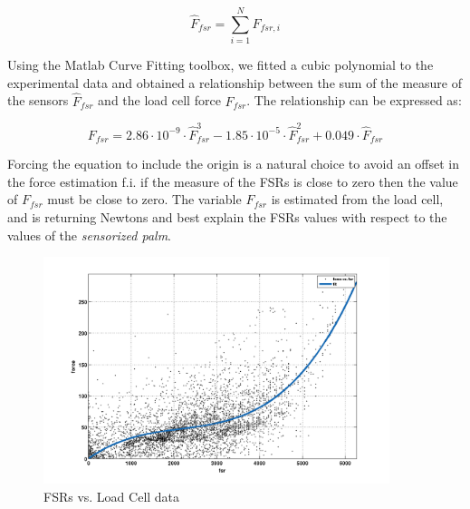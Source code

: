 \begin{equation}
\hat{F}_{fsr} = \sum_{i=1}^{N} F_{fsr,i}
\label{eq:sumofFSR}
\end{equation}

Using the Matlab Curve Fitting toolbox, we fitted a cubic polynomial to the experimental data and obtained a relationship between the sum of the measure of the sensors $\hat{F}_{fsr}$ and the load cell force $F_{fsr}$. The relationship can be expressed as:

\begin{equation}
F_{fsr} = 2.86 \cdot 10^{-9}\cdot \hat{F}_{fsr}^3 - 1.85 \cdot 10^{-5} \cdot \hat{F}_{fsr}^2 + 0.049 \cdot \hat{F}_{fsr} 
\label{eq:fsrdummyfit}
\end{equation}

Forcing the equation to include the origin is a natural choice to avoid an offset in the force estimation f.i. if the measure of the FSRs is close to zero then the value of $F_{fsr}$ must be close to zero.
The variable $F_{fsr}$ is estimated from the load cell, and is returning Newtons and best explain the FSRs values with respect to the values of the \textit{sensorized palm}.
% 
 
\begin{figure}[h]
\centering
\includegraphics[width=0.9\textwidth]{Figure/fsrtodummy.png}
\caption{FSRs vs. Load Cell data}
\label{Fig:FSRcalibratedModel}
\end{figure}

